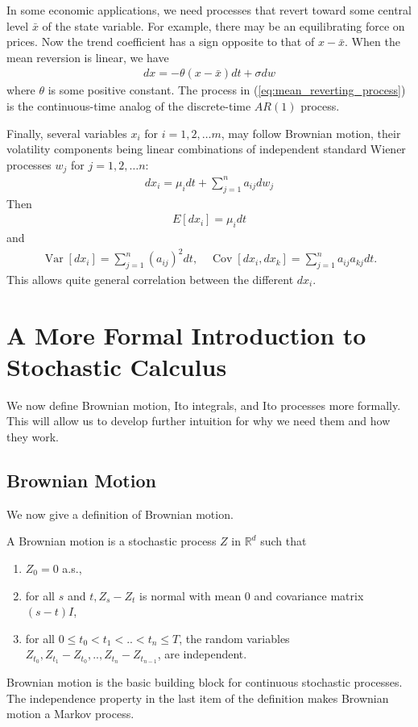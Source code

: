 \documentclass[\topdir/lecture\_notes.tex]{subfiles}
\begin{document}
In some economic applications, we need processes that revert toward some central level $\bar{x}$ of the state variable. For example, there may be an equilibrating force on prices. Now the trend coefficient has a sign opposite to that of $x-\bar{x}$. When the mean reversion is linear, we have
\begin{align}
dx=-\theta(x-\bar{x}) dt+\sigma dw \label{eq:mean_reverting_process}
\end{align}
where $\theta$ is some positive constant. The process in (\ref{eq:mean_reverting_process}) is the continuous-time analog of the discrete-time $AR(1)$ process.

Finally, several variables $x_{i}$ for $i=1,2, \ldots m$, may follow Brownian motion, their volatility components being linear combinations of independent standard Wiener processes $w_{j}$ for $j=1,2, \ldots n$:
\begin{align*}
dx_{i}=\mu_{i} dt+\sum_{j=1}^{n} a_{i j} dw_{j}
\end{align*}
Then
\begin{align*}
E\left[dx_{i}\right]=\mu_{i} dt
\end{align*}
and
\begin{align*}
\operatorname{Var}\left[dx_{i}\right]=\sum_{j=1}^{n}\left(a_{i j}\right)^{2} dt, \quad \operatorname{Cov}\left[dx_{i}, dx_{k}\right]=\sum_{j=1}^{n} a_{i j} a_{k j} dt.
\end{align*}
This allows quite general correlation between the different $dx_{i}$.


\section{A More Formal Introduction to Stochastic Calculus}
We now define Brownian motion, Ito integrals, and Ito processes more formally. This will allow us to develop further intuition for why we need them and how they work.

\subsection{Brownian Motion}
We now give a definition of Brownian motion.

\begin{defn}\label{defn:brownian_motion}
A Brownian motion is a stochastic process $Z$ in $\mathbb{R}^{d}$ such that
\begin{enumerate}
  \item $Z_{0}=0$ a.s.,

  \item for all $s$ and $t, Z_{s}-Z_{t}$ is normal with mean 0 and covariance matrix $(s-t) I$,

  \item for all $0 \leq t_{0}<t_{1}<. .<t_{n} \leq T$, the random variables $Z_{t_{0}}, Z_{t_{1}}-Z_{t_{0}}, . ., Z_{t_{n}}-Z_{t_{n-1}}$, are independent.
\end{enumerate}
\end{defn}
Brownian motion is the basic building block for continuous stochastic processes. The independence property in the last item of the definition makes Brownian motion a Markov process.
\end{document}
